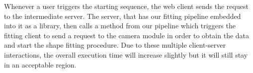 Whenever a user triggers the starting sequence, the web client sends the request to the intermediate server. The server, that has our fitting pipeline embedded into it as a library, then calls a method from our pipeline which triggers the fitting client to send a request to the camera module in order to obtain the data and start the shape fitting procedure. Due to these multiple client-server interactions, the overall execution time will increase slightly but it will still stay in an acceptable region. 